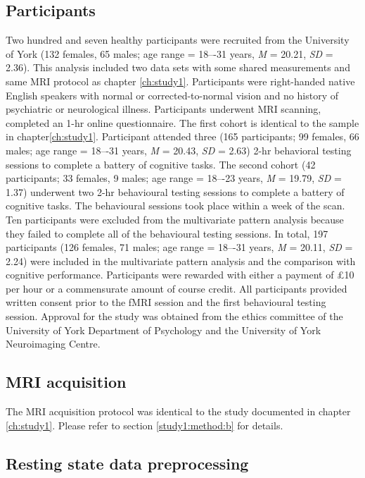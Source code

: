 \subsection{Participants}
\label{study3:method:a}
Two hundred and seven healthy participants were recruited from the University of York (132 females, 65 males; age range = 18–-31 years, \textit{M} = 20.21, \textit{SD} = 2.36).
This analysis included two data sets with some shared measurements and same MRI protocol as chapter \ref{ch:study1}.
Participants were right-handed native English speakers with normal or corrected-to-normal vision and no history of psychiatric or neurological illness. Participants underwent MRI scanning, completed an 1-hr online questionnaire. The first cohort is identical to the sample in chapter\ref{ch:study1}. Participant attended three
(165 participants; 99 females, 66 males; age range = 18–-31 years, \textit{M} = 20.43, \textit{SD} = 2.63) 2-hr behavioral testing sessions to complete a battery of cognitive tasks.
The second cohort (42 participants; 33 females, 9 males; age range = 18–-23 years, \textit{M} = 19.79, \textit{SD} = 1.37) underwent two 2-hr behavioural testing sessions to complete a battery of cognitive tasks. The behavioural sessions took place within a week of the scan. Ten participants were excluded from the multivariate pattern analysis because they failed to complete all of the behavioural testing sessions. In total, 197 participants (126 females, 71 males; age range = 18–-31 years, \textit{M} = 20.11, \textit{SD} = 2.24) were included in the multivariate pattern analysis and the comparison with cognitive performance. Participants were rewarded with either a payment of \pounds 10 per hour or a commensurate amount of course credit. All participants provided written consent prior to the fMRI session and the first behavioural testing session. Approval for the study was obtained from the ethics committee of the University of York Department of Psychology and the University of York Neuroimaging Centre.

\subsection{MRI acquisition}
\label{study3:method:b}
The MRI acquisition protocol was identical to the study documented in chapter \ref{ch:study1}. Please refer to section \ref{study1:method:b} for details.

\subsection{Resting state data preprocessing}
\label{study3:method:c}


